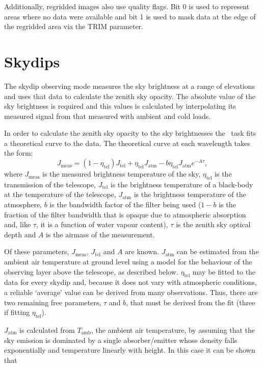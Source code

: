 \documentclass[twoside,11pt]{starlink}
\providecommand{\task}[1]{#1}
\providecommand{\skydip}{\htmlref{\task{skydip}}{SKYDIP}}
\begin{document}
Additionally, regridded images also use quality flags. Bit 0 is used
to represent areas where no data were available and bit 1 is used to mask
data at the edge of the regridded area via the TRIM parameter.

\section{Skydips\label{skydips}}

The skydip observing mode measures the sky brightness at a range of elevations
and uses that data to calculate the zenith sky opacity. The absolute
value of the sky brightness is required and this values
is calculated by interpolating its measured signal from that measured with
ambient and cold loads.

In order to calculate the zenith sky opacity to the sky brightnesses
the \skydip\ task fits a theoretical curve to the data. The theoretical
curve at each wavelength takes the form:
\begin{equation}
J_\mathrm{meas} = (1 - \eta_\mathrm{tel}) J_\mathrm{tel} +
                   \eta_\mathrm{tel} J_\mathrm{atm} -
                   b  \eta_\mathrm{tel} J_\mathrm{atm} e^{-A\tau},
\end{equation}
where $J_\mathrm{meas}$ is the measured brightness temperature of the
sky, $\eta_\mathrm{tel}$ is the transmission of the telescope,
$J_\mathrm{tel}$ is the brightness temperature of a black-body at the
temperature of the telescope, $J_\mathrm{atm}$ is the brightness
temperature of the atmosphere, $b$ is the bandwidth factor of the filter
being used ($1-b$ is the fraction of the filter bandwidth that is opaque
due to atmospheric absorption and, like $\tau$, it is a function of water
vapour content), $\tau$ is the zenith sky optical depth and $A$ is the
airmass of the measurement.

Of these parameters, $J_\mathrm{meas}$, $J_\mathrm{tel}$  and $A$ are known.
$J_\mathrm{atm}$ can be estimated from the ambient air temperature at ground
level using a model for the behaviour of the observing layer above the
telescope, as described below. $\eta_\mathrm{tel}$ may be fitted to the data
for every skydip and, because it does not vary with atmospheric conditions, a
reliable `average' value can be derived from many observations. Thus, there
are two remaining free parameters, $\tau$ and $b$, that must be derived
from the fit (three if fitting $\eta_\mathrm{tel}$).

$J_\mathrm{atm}$ is calculated from $T_\mathrm{amb}$, the ambient air
temperature, by assuming that the sky emission is dominated by a single
absorber/emitter whose density falls exponentially and temperature linearly
with height. In this case it can be shown that
\end{document}
